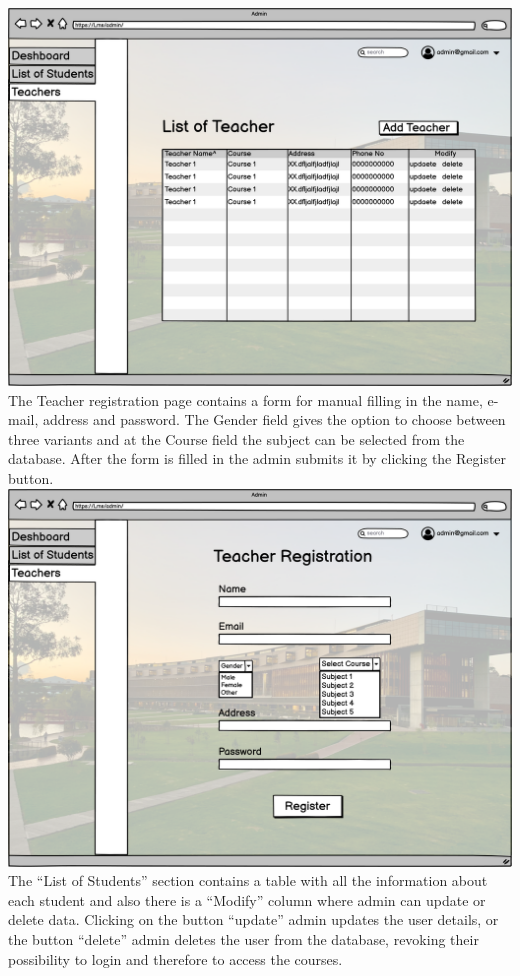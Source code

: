\includegraphics[width=\columnwidth]{images/Teachers.png}\\
\newpage
The Teacher registration page contains a form for manual filling in the name, e-mail, address and password. The Gender field gives the option to choose between three variants and at the Course field the subject can be selected from the database. After the form is filled in the admin submits it by clicking the Register button.\\

\includegraphics[width=\columnwidth]{images/TeacherRegistration.png}\\
\newpage
The “List of Students” section contains a table  with all the information about each student and also there is a “Modify” column where admin can update or delete data.  Clicking on the button “update” admin updates the user details, or the button “delete” admin deletes the user from the database, revoking their possibility to login and therefore to access the courses.\\


